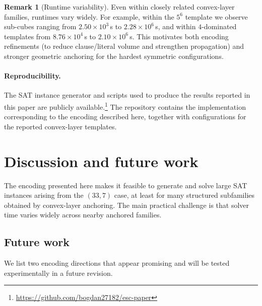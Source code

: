 \documentclass[11pt,a4paper]{article}
\theoremstyle{definition}
\newtheorem{remark}{Remark}
\begin{document}
\begin{remark}[Runtime variability]
Even within closely related convex-layer families, runtimes vary widely. For example, within the $5^6$ template we observe sub-cubes ranging from $2.50\times 10^{3}$\,s to $2.28\times 10^{6}$\,s, and within $4$-dominated templates from $8.76\times 10^{4}$\,s to $2.10\times 10^{6}$\,s. This motivates both encoding refinements (to reduce clause/literal volume and strengthen propagation) and stronger geometric anchoring for the hardest symmetric configurations.
\end{remark}

\paragraph{Reproducibility.}
The SAT instance generator and scripts used to produce the results reported in this paper are publicly available.\footnote{\url{https://github.com/bogdan27182/esc-paper}}
The repository contains the implementation corresponding to the encoding described here, together with configurations for the reported convex-layer templates.



\section{Discussion and future work}

The encoding presented here makes it feasible to generate and solve large SAT instances arising from the $(33,7)$ case, at least for many structured subfamilies obtained by convex-layer anchoring. The main practical challenge is that solver time varies widely across nearby anchored families.

\subsection*{Future work}
We list two encoding directions that appear promising and will be tested experimentally in a future revision. 
\end{document}
